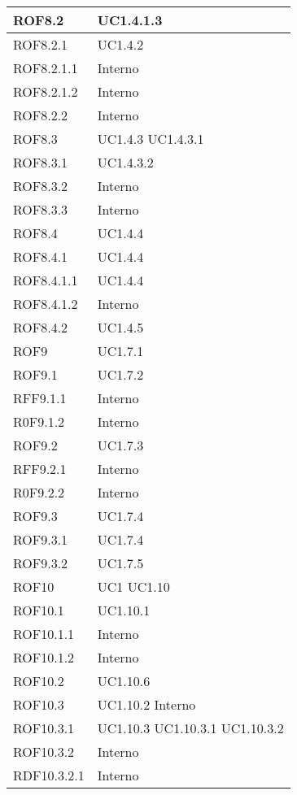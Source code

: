 \begin{center}
\begin{longtable}{| p{4cm} | p{4cm} |}
ROF8.2   &  UC1.4.1.3 \\
\hline
ROF8.2.1   &  UC1.4.2 \\
\hline
ROF8.2.1.1   &  Interno \\
\hline
ROF8.2.1.2   &  Interno \\
\hline
ROF8.2.2   &  Interno \\
\hline
ROF8.3   &  UC1.4.3 \newline UC1.4.3.1  \\
\hline
ROF8.3.1   &  UC1.4.3.2 \\
\hline
ROF8.3.2   &  Interno \\
\hline
ROF8.3.3   &  Interno \\
\hline
ROF8.4   &  UC1.4.4  \\
\hline
ROF8.4.1   &  UC1.4.4  \\
\hline
ROF8.4.1.1   &  UC1.4.4  \\
\hline
ROF8.4.1.2   &  Interno  \\
\hline
ROF8.4.2   &  UC1.4.5  \\
\hline
ROF9   &  UC1.7.1 \\
\hline
ROF9.1   &  UC1.7.2 \\
\hline
RFF9.1.1   &  Interno \\
\hline
R0F9.1.2   &  Interno \\
\hline
ROF9.2   &  UC1.7.3 \\
\hline
RFF9.2.1   &  Interno \\
\hline
R0F9.2.2   &  Interno \\
\hline
ROF9.3   &  UC1.7.4 \\
\hline
ROF9.3.1   &  UC1.7.4 \\
\hline
ROF9.3.2   &  UC1.7.5 \\
\hline
ROF10   &  UC1 \newline UC1.10 \\
\hline
ROF10.1   &  UC1.10.1 \\
\hline
ROF10.1.1   &  Interno \\
\hline
ROF10.1.2   &  Interno \\
\hline
ROF10.2   &  UC1.10.6 \\
\hline
ROF10.3   &  UC1.10.2 \newline Interno \\
\hline
ROF10.3.1   &  UC1.10.3 \newline UC1.10.3.1 \newline UC1.10.3.2 \\
\hline
ROF10.3.2   &  Interno \\
\hline
RDF10.3.2.1   &  Interno \\

\end{longtable}
\end{center}
